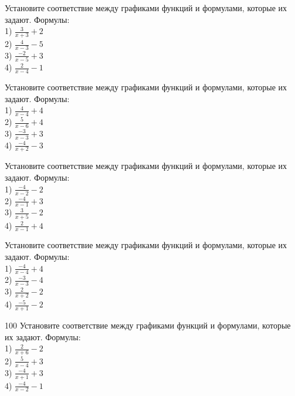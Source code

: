 \documentclass[4apaper]{article}
\begin{document}
\begin{taskBN}{96}
Установите соответствие между графиками функций и формулами, которые их задают. Формулы: \\1) $\frac{3}{x+3}+2$\\2) $\frac{4}{x-3}-5$\\3) $\frac{-2}{x-5}+3$\\4) $\frac{2}{x-4}-1$
\end{taskBN}

\begin{taskBN}{97}
Установите соответствие между графиками функций и формулами, которые их задают. Формулы: \\1) $\frac{4}{x-4}+4$\\2) $\frac{5}{x-6}+4$\\3) $\frac{-3}{x-3}+3$\\4) $\frac{-4}{x+2}-3$
\end{taskBN}

\begin{taskBN}{98}
Установите соответствие между графиками функций и формулами, которые их задают. Формулы: \\1) $\frac{-4}{x-2}-2$\\2) $\frac{-4}{x-1}+3$\\3) $\frac{3}{x+5}-2$\\4) $\frac{2}{x-1}+4$
\end{taskBN}

\begin{taskBN}{99}
Установите соответствие между графиками функций и формулами, которые их задают. Формулы: \\1) $\frac{-4}{x-4}+4$\\2) $\frac{-3}{x-3}-4$\\3) $\frac{2}{x+2}-2$\\4) $\frac{-5}{x+1}-2$
\end{taskBN}

\begin{taskBN}{100}
Установите соответствие между графиками функций и формулами, которые их задают. Формулы: \\1) $\frac{2}{x+6}-2$\\2) $\frac{5}{x-4}+3$\\3) $\frac{-4}{x+1}+3$\\4) $\frac{-4}{x-2}-1$
\end{taskBN}
\end{document}

